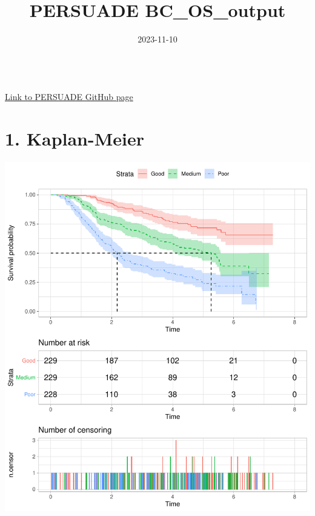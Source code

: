 \documentclass[
]{article}
\title{PERSUADE BC\_OS\_output}
\author{}
\date{\vspace{-2.5em}2023-11-10}
\begin{document}
\maketitle

{
\hypersetup{linkcolor=}
\setcounter{tocdepth}{2}
\tableofcontents
}
~\\

\href{https://github.com/Bram-R/PERSUADE}{Link to PERSUADE GitHub page}
\clearpage

\hypertarget{kaplan-meier}{%
\section{1. Kaplan-Meier}\label{kaplan-meier}}

\begin{flushleft}\includegraphics{Images/plot_KM-1} \end{flushleft}
\end{document}
